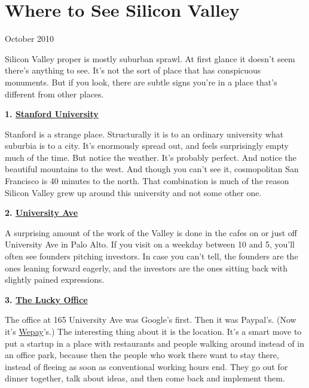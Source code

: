 \chapter{Where to See Silicon Valley}


            
              
                


                  
                    October 2010

Silicon Valley proper is mostly
                    suburban sprawl. At first glance it doesn't seem there's
                    anything to see. It's not the sort of place that has
                    conspicuous monuments. But if you look, there are subtle
                    signs you're in a place that's different from other
                    places.

\textbf{1.
                      \href{http://maps.google.com/maps?q=stanford+university}{Stanford University}}

Stanford is a strange place. Structurally it is
                    to an ordinary university what suburbia is to a city. It's
                    enormously spread out, and feels surprisingly empty much of
                    the time. But notice the weather. It's probably perfect. And
                    notice the beautiful mountains to the west. And though you
                    can't see it, cosmopolitan San Francisco is 40 minutes to
                    the north. That combination is much of the reason Silicon
                    Valley grew up around this university and not some other
                    one.

\textbf{2.
                      \href{http://maps.google.com/maps?q=university+and+ramona+palo+alto}{University Ave}}

A surprising amount of the work of the Valley
                    is done in the cafes on or just off University Ave in Palo
                    Alto. If you visit on a weekday between 10 and 5, you'll
                    often see founders pitching investors. In case you can't
                    tell, the founders are the ones leaning forward eagerly, and
                    the investors are the ones sitting back with slightly pained
                    expressions.

\textbf{3.
                      \href{http://maps.google.com/maps?q=165+university+ave+palo+alto}{The Lucky Office}}

The office at 165 University Ave was Google's
                    first. Then it was Paypal's. (Now it's
                    \href{http://wepay.com}{Wepay}'s.) The interesting
                    thing about it is the location. It's a smart move to put a
                    startup in a place with restaurants and people walking
                    around instead of in an office park, because then the people
                    who work there want to stay there, instead of fleeing as
                    soon as conventional working hours end. They go out for
                    dinner together, talk about ideas, and then come back and
                    implement them.

